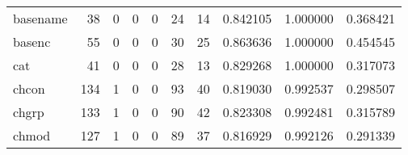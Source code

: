 \begin{tabular}{lrrrrrrrrr}
basename  &                                        38 &                                                  0 &                                                  0 &                                                  0 &                                                 24 &                                                 14 &                                           0.842105 &                               1.000000 &                             0.368421 \\
basenc    &                                        55 &                                                  0 &                                                  0 &                                                  0 &                                                 30 &                                                 25 &                                           0.863636 &                               1.000000 &                             0.454545 \\
cat       &                                        41 &                                                  0 &                                                  0 &                                                  0 &                                                 28 &                                                 13 &                                           0.829268 &                               1.000000 &                             0.317073 \\
chcon     &                                       134 &                                                  1 &                                                  0 &                                                  0 &                                                 93 &                                                 40 &                                           0.819030 &                               0.992537 &                             0.298507 \\
chgrp     &                                       133 &                                                  1 &                                                  0 &                                                  0 &                                                 90 &                                                 42 &                                           0.823308 &                               0.992481 &                             0.315789 \\
chmod     &                                       127 &                                                  1 &                                                  0 &                                                  0 &                                                 89 &                                                 37 &                                           0.816929 &                               0.992126 &                             0.291339 \\

\end{tabular}
